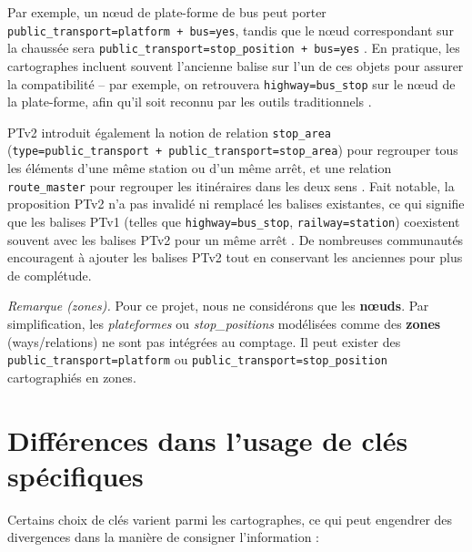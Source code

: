 \begin{itemize}
    Par exemple, un nœud de plate-forme de bus peut porter \verb|public_transport=platform + bus=yes|, tandis que le nœud correspondant sur la chaussée sera \verb|public_transport=stop_position + bus=yes| . En pratique, les cartographes incluent souvent l'ancienne balise sur l'un de ces objets pour assurer la compatibilité – par exemple, on retrouvera \verb|highway=bus_stop| sur le nœud de la plate-forme, afin qu'il soit reconnu par les outils traditionnels .
    
    PTv2 introduit également la notion de relation \verb|stop_area| (\verb|type=public_transport + public_transport=stop_area|) pour regrouper tous les éléments d'une même station ou d'un même arrêt, et une relation \verb|route_master| pour regrouper les itinéraires dans les deux sens . Fait notable, la proposition PTv2 n'a pas invalidé ni remplacé les balises existantes, ce qui signifie que les balises PTv1 (telles que \verb|highway=bus_stop|, \texttt{railway=station}) coexistent souvent avec les balises PTv2 pour un même arrêt . De nombreuses communautés encouragent à ajouter les balises PTv2 tout en conservant les anciennes pour plus de complétude.
\end{itemize}


\noindent\textit{Remarque (zones).} Pour ce projet, nous ne considérons que les \textbf{nœuds}. Par simplification, les \textit{plateformes} ou \textit{stop\_positions} modélisées comme des \textbf{zones} (ways/relations) ne sont pas intégrées au comptage. Il peut exister des \verb|public_transport=platform| ou \verb|public_transport=stop_position| cartographiés en zones.


\section{Différences dans l’usage de clés spécifiques}
Certains choix de clés varient parmi les cartographes, ce qui peut engendrer des divergences dans la manière de consigner l'information :

